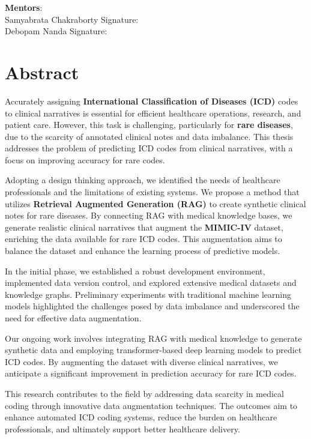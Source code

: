 \documentclass[12pt,a4paper]{report}
\begin{document}
\vspace{1in}

\noindent \textbf{Mentors}: \\
Samyabrata Chakraborty \hfill Signature: \\
Debopam Nanda \hfill Signature: \\

\vfill
\newpage

\chapter*{Abstract}
Accurately assigning \textbf{International Classification of Diseases (ICD)} codes to clinical narratives is essential for efficient healthcare operations, research, and patient care. However, this task is challenging, particularly for \textbf{rare diseases}, due to the scarcity of annotated clinical notes and data imbalance. This thesis addresses the problem of predicting ICD codes from clinical narratives, with a focus on improving accuracy for rare codes.

Adopting a design thinking approach, we identified the needs of healthcare professionals and the limitations of existing systems. We propose a method that utilizes \textbf{Retrieval Augmented Generation (RAG)} to create synthetic clinical notes for rare diseases. By connecting RAG with medical knowledge bases, we generate realistic clinical narratives that augment the \textbf{MIMIC-IV} dataset, enriching the data available for rare ICD codes. This augmentation aims to balance the dataset and enhance the learning process of predictive models.

In the initial phase, we established a robust development environment, implemented data version control, and explored extensive medical datasets and knowledge graphs. Preliminary experiments with traditional machine learning models highlighted the challenges posed by data imbalance and underscored the need for effective data augmentation.

Our ongoing work involves integrating RAG with medical knowledge to generate synthetic data and employing transformer-based deep learning models to predict ICD codes. By augmenting the dataset with diverse clinical narratives, we anticipate a significant improvement in prediction accuracy for rare ICD codes.

This research contributes to the field by addressing data scarcity in medical coding through innovative data augmentation techniques. The outcomes aim to enhance automated ICD coding systems, reduce the burden on healthcare professionals, and ultimately support better healthcare delivery.
\end{document}
